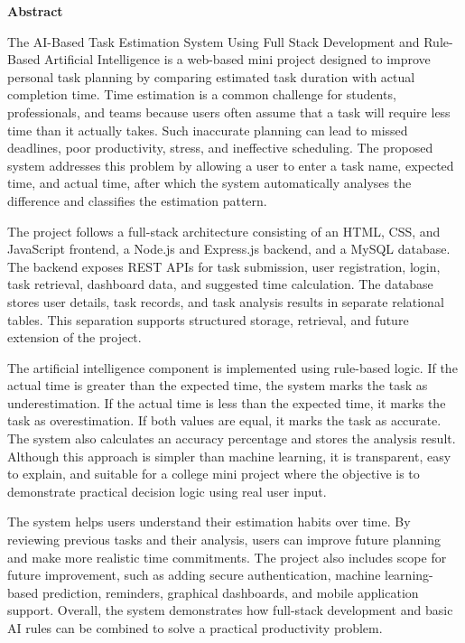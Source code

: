 \newpage
\begin{center}
    \vspace*{0.05cm}
    \Large
    \textbf{Abstract}\\
    \vspace{0.5cm}
\end{center}

\begin{justify}
The AI-Based Task Estimation System Using Full Stack Development and Rule-Based Artificial Intelligence is a web-based mini project designed to improve personal task planning by comparing estimated task duration with actual completion time. Time estimation is a common challenge for students, professionals, and teams because users often assume that a task will require less time than it actually takes. Such inaccurate planning can lead to missed deadlines, poor productivity, stress, and ineffective scheduling. The proposed system addresses this problem by allowing a user to enter a task name, expected time, and actual time, after which the system automatically analyses the difference and classifies the estimation pattern.

The project follows a full-stack architecture consisting of an HTML, CSS, and JavaScript frontend, a Node.js and Express.js backend, and a MySQL database. The backend exposes REST APIs for task submission, user registration, login, task retrieval, dashboard data, and suggested time calculation. The database stores user details, task records, and task analysis results in separate relational tables. This separation supports structured storage, retrieval, and future extension of the project.

The artificial intelligence component is implemented using rule-based logic. If the actual time is greater than the expected time, the system marks the task as underestimation. If the actual time is less than the expected time, it marks the task as overestimation. If both values are equal, it marks the task as accurate. The system also calculates an accuracy percentage and stores the analysis result. Although this approach is simpler than machine learning, it is transparent, easy to explain, and suitable for a college mini project where the objective is to demonstrate practical decision logic using real user input.

The system helps users understand their estimation habits over time. By reviewing previous tasks and their analysis, users can improve future planning and make more realistic time commitments. The project also includes scope for future improvement, such as adding secure authentication, machine learning-based prediction, reminders, graphical dashboards, and mobile application support. Overall, the system demonstrates how full-stack development and basic AI rules can be combined to solve a practical productivity problem.
\end{justify}
